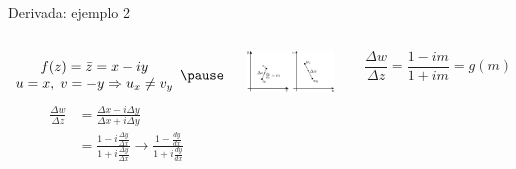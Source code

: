 \documentclass[9pt, aspectratio=169]{beamer}
\begin{document}
\begin{frame}{Derivada: ejemplo 2}
 \begin{columns}[c]
  \[
  \begin{array}{c}
   f(z) = \bar{z} = x - i y \\
   u = x, \; v = -y \Rightarrow u_x \neq v_y 
   \end{array} \pause
   \] \vspace{1em}
  \begin{align*}
   \frac{\Delta w}{\Delta z} &= \frac{\Delta x - i \Delta y}{\Delta x + i \Delta y} \\
   &= \frac{1 - i \frac{\Delta y}{\Delta x}}{1 + i \frac{\Delta y}{\Delta x}} \rightarrow \frac{1 - \frac{dy}{dx}}{1 + i \frac{dy}{dx}}
  \end{align*} \pause

  \includegraphics[width=0.9\textwidth]{figs/fig-05}
  
  \[ \frac{\Delta w}{\Delta z} = \frac{1 - im}{1 + im} = g(m) \]
 \end{columns}
\end{frame}
\end{document}
